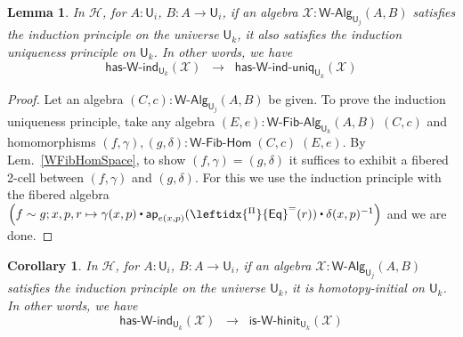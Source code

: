 \documentclass[reqno,10pt,a4paper,oneside]{amsart}
\newcommand{\X}{\mathcal{X}}
\newcommand{\W}{\mathsf{W}}
\newcommand{\funext}{\leftidx{^\Pi}{\mathsf{Eq}}^{=}}
\newcommand{\UU}{\mathsf{U}}
\newcommand{\WAlg}{\mathsf{W}\text{-}\mathsf{Alg}}
\newcommand{\WFibAlg}{\mathsf{W}\text{-}\mathsf{Fib}\text{-}\mathsf{Alg}}
\newcommand{\WFibHom}{\mathsf{W}\text{-}\mathsf{Fib}\text{-}\mathsf{Hom}}
\newcommand{\HasWRec}{\mathsf{has}\text{-}\mathsf{W}\text{-}\mathsf{rec}}
\newcommand{\HasWInd}{\mathsf{has}\text{-}\mathsf{W}\text{-}\mathsf{ind}}
\newcommand{\HasWRecUniq}{\mathsf{has}\text{-}\mathsf{W}\text{-}\mathsf{rec}\text{-}\mathsf{uniq}}
\newcommand{\HasWIndUniq}{\mathsf{has}\text{-}\mathsf{W}\text{-}\mathsf{ind}\text{-}\mathsf{uniq}}
\newcommand{\IsWHInit}{\mathsf{is}\text{-}\mathsf{\W}\text{-}\mathsf{hinit}}
\newcommand{\app}{\mathsf{ap}}
\newcommand{\Hint}{\mathcal{H}}
\newcommand{\ct}{%
  \mathchoice{\mathbin{\raisebox{0.5ex}{$\displaystyle\centerdot$}}}%
             {\mathbin{\raisebox{0.5ex}{$\centerdot$}}}%
             {\mathbin{\raisebox{0.25ex}{$\scriptstyle\,\centerdot\,$}}}%
             {\mathbin{\raisebox{0.1ex}{$\scriptscriptstyle\,\centerdot\,$}}}}
\numberwithin{equation}{section}
\theoremstyle{mythm}
\newtheorem{lemma}[theorem]{Lemma}
\newtheorem{corollary}[theorem]{Corollary}
\theoremstyle{mydef}
\theoremstyle{myrmk}
\begin{document}
\begin{lemma}\label{lem:WIndImpUniqInt}
In $\Hint$, for $A:\UU_i$, $B : A \to \UU_i$, if an algebra $\X : \WAlg_{\UU_j}(A,B)$ satisfies the induction principle on the universe $\UU_k$, it also satisfies the induction uniqueness principle on $\UU_k$. In other words, we have
\[ \HasWInd_{\UU_k}(\X) \;\; \rightarrow \;\; \HasWIndUniq_{\UU_k}(\X) \]
\end{lemma}
\begin{proof}
Let an algebra $(C,c) : \WAlg_{\UU_j}(A,B)$ be given. To prove the induction uniqueness principle, take any algebra $(E,e) : \WFibAlg_{\UU_k}(A,B) \; (C,c)$ and homomorphisms $(f,\gamma), (g,\delta) : \WFibHom \; (C,c) \; (E,e)$. By Lem.~\ref{WFibHomSpace}, to show $(f,\gamma) = (g,\delta)$ it suffices to exhibit a fibered 2-cell between $(f,\gamma)$ and $(g,\delta)$. For this we use the induction principle with the fibered algebra $\Big(f \sim g; x,p,r \mapsto \gamma(x,p) \ct \app_{e(x,p)}(\funext(r)) \ct \delta(x,p)^{-1}\Big)$ and we are done.
\end{proof}


\begin{corollary}\label{lem:WIndImpHInitInt}
In $\Hint$, for $A:\UU_i$, $B : A \to \UU_i$, if an algebra $\X : \WAlg_{\UU_j}(A,B)$ satisfies the induction principle on the universe $\UU_k$, it is homotopy-initial on $\UU_k$. In other words, we have
\[ \HasWInd_{\UU_k}(\X) \;\; \rightarrow \;\; \IsWHInit_{\UU_k}(\X) \]
\end{corollary}
\end{document}
